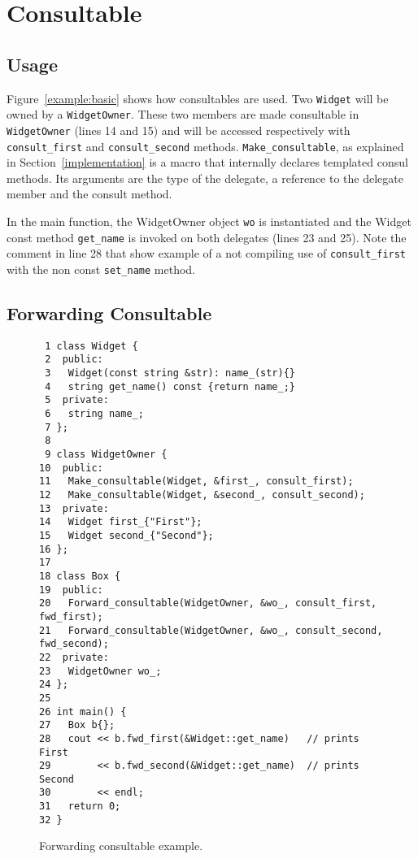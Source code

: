 \documentclass{article}
\begin{document}
\section{Consultable}
\subsection{Usage}

Figure~\ref{example:basic} shows how consultables are used. Two \verb+Widget+ will be owned by a \verb+WidgetOwner+. These two members are made consultable in \verb+WidgetOwner+ (lines 14 and 15) and will be accessed respectively with \verb+consult_first+ and \verb+consult_second+ methods. \verb+Make_consultable+, as explained in Section~\ref{implementation} is a macro that internally declares templated consul methods. Its arguments are the type of the delegate, a reference to the delegate member and the consult method. 

In the main function, the WidgetOwner object \verb+wo+ is instantiated and the Widget const method \verb+get_name+ is invoked on both delegates (lines 23 and 25). Note the comment in line 28 that show example of a not compiling use of \verb+consult_first+ with the non const \verb+set_name+ method. 

\subsection{Forwarding Consultable}

\begin{figure}[ht]
{\small
\begin{lstlisting}
 1 class Widget {
 2  public:
 3   Widget(const string &str): name_(str){}
 4   string get_name() const {return name_;}
 5  private:
 6   string name_;
 7 };
 8 
 9 class WidgetOwner {
10  public:
11   Make_consultable(Widget, &first_, consult_first);
12   Make_consultable(Widget, &second_, consult_second);
13  private:
14   Widget first_{"First"};
15   Widget second_{"Second"};
16 };
17 
18 class Box {
19  public:
20   Forward_consultable(WidgetOwner, &wo_, consult_first, fwd_first);
21   Forward_consultable(WidgetOwner, &wo_, consult_second, fwd_second);
22  private:
23   WidgetOwner wo_;
24 };
25 
26 int main() {
27   Box b{};
28   cout << b.fwd_first(&Widget::get_name)   // prints First
29        << b.fwd_second(&Widget::get_name)  // prints Second
30        << endl; 
31   return 0;
32 }
\end{lstlisting}}
\cprotect\caption{Forwarding consultable example.}
\label{example:forward}
\end{figure}
\end{document}
